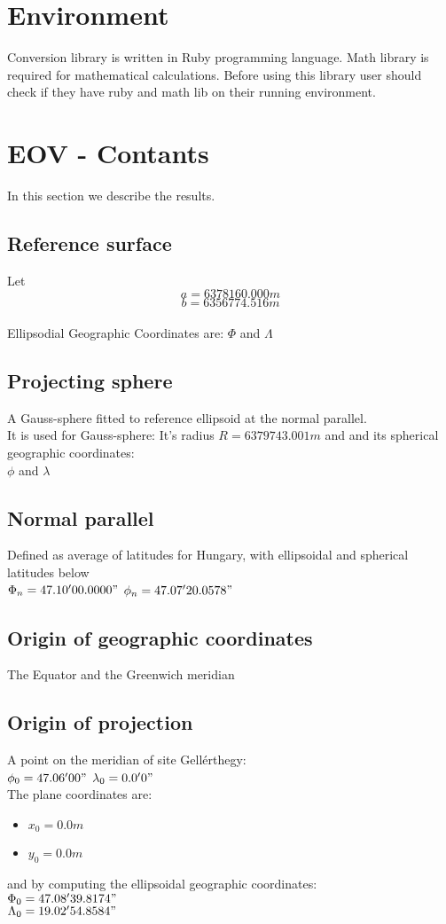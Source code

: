 \documentclass[10pt]{article}
\begin{document}
\section{Environment}\label{previous work}
	Conversion library is written in Ruby programming language. Math library is required for mathematical calculations.
	Before using this library user should check if they have ruby and math lib on their running environment.
	
\section{EOV - Contants}\label{eov}
	In this section we describe the results.
	\subsection{Reference surface}
	Let \\
	$$ a = 6 378 160.000 m $$
	$$ b = 6 356 774.516 m $$
	\\
	Ellipsodial Geographic Coordinates are: $\Phi$ and $\Lambda$
	
	\subsection{Projecting sphere}
	A Gauss-sphere fitted to reference ellipsoid at the normal parallel.
	\\
	It is used for Gauss-sphere:
	It's radius $R = 6 379 743.001 m$ and and its spherical geographic coordinates:
	\\
	$\phi$ and $\lambda$
	
	\subsection{Normal parallel}
	Defined as average of latitudes for Hungary, with ellipsoidal and spherical latitudes below
	\\
	$\Phi_n = 47.10'00.0000"$
	$\phi_n = 47.07'20.0578"$
	
	\subsection{Origin of geographic coordinates}
	The Equator and the Greenwich meridian
	
	\subsection{Origin of projection}
	A point on the meridian of site Gellérthegy:
	\\
	$\phi_0 = 47.06'00"$
	$\lambda_0 = 0.0'0"$
	\\
	The plane coordinates are:
	\begin{itemize}
		\item $x_0 = 0.0 m$
		\item $y_0 = 0.0 m$
	\end{itemize}
	and by computing the ellipsoidal geographic coordinates:
	\\
	$\Phi_0 = 47.08'39.8174"$
	\\
	$\Lambda_0 = 19.02'54.8584"$
\end{document}
